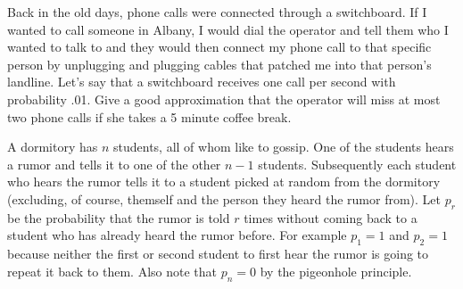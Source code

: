 \documentclass[addpoints,12pt]{exam}
\begin{document}
\begin{questions}
\begin{parts}
\vspace{2in}

\end{parts}
\addpoints

\question[2] Back in the old days, phone calls were connected through a switchboard. If I wanted to call someone in Albany, I would dial the operator and tell them who I wanted to talk to and they would then connect my phone call to that specific person by unplugging and plugging cables that patched me into that person's landline.
Let's say that a switchboard receives one call per second with probability .01. Give a good approximation that the operator will miss at most two phone calls if she takes a 5 minute coffee break.

\vspace{1.5in}


\newpage
\question[4] A dormitory has $n$ students, all of whom like to gossip. One of the students hears a rumor and tells it to one of the other $n-1$ students. Subsequently each student who hears the rumor tells it to a student picked at random from the dormitory (excluding, of course, themself and the person they heard the rumor from). Let $p_r$ be the probability that the rumor is told $r$ times without coming back to a student who has already heard the rumor before. For example $p_1=1$ and $p_2=1$ because neither the first or second student to first hear the rumor is going to repeat it back to them. Also note that $p_n=0$ by the pigeonhole principle.

\noaddpoints
{}
\addpoints




\end{questions}
\end{document}
